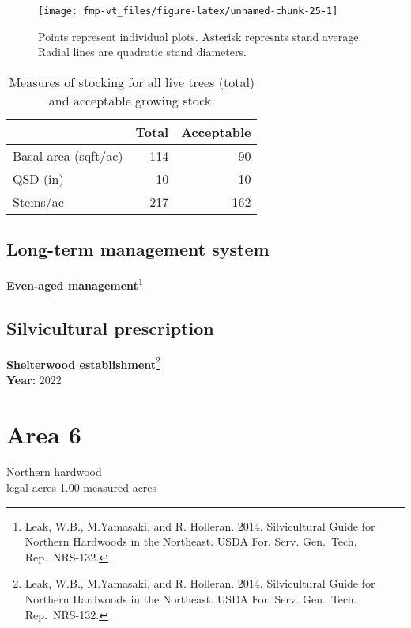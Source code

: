 \documentclass[]{tufte-handout}
\begin{document}
\begin{figure}
\texttt{[image: fmp-vt\_files/figure-latex/unnamed-chunk-25-1]} \caption[Points represent individual plots]{Points represent individual plots. Asterisk represnts stand average. Radial lines are quadratic stand diameters.}\label{fig:unnamed-chunk-25}
\end{figure}

\begin{table}

\caption{\label{tab:unnamed-chunk-26}Measures of stocking for all live trees (total) and acceptable growing stock.}
\centering
\begin{tabular}[t]{lrr}
\toprule
  & Total & Acceptable\\
\midrule
Basal area (sqft/ac) & 114 & 90\\
QSD (in) & 10 & 10\\
Stems/ac & 217 & 162\\
\bottomrule
\end{tabular}
\end{table}

\subsection{Long-term management
system}\label{long-term-management-system-4}

\textbf{Even-aged management}\footnote{Leak, W.B., M.Yamasaki, and R.
  Holleran. 2014. Silvicultural Guide for Northern Hardwoods in the
  Northeast. USDA For. Serv. Gen.~Tech. Rep.~NRS-132.}

\subsection{Silvicultural
prescription}\label{silvicultural-prescription-4}

\textbf{Shelterwood establishment}\footnote{Leak, W.B., M.Yamasaki, and
  R. Holleran. 2014. Silvicultural Guide for Northern Hardwoods in the
  Northeast. USDA For. Serv. Gen.~Tech. Rep.~NRS-132.}\\
\textbf{Year:} 2022

\newpage

\section{Area 6}\label{area-6}

Northern hardwood\\
 legal acres \textbar{} 1.00 measured acres
\end{document}
